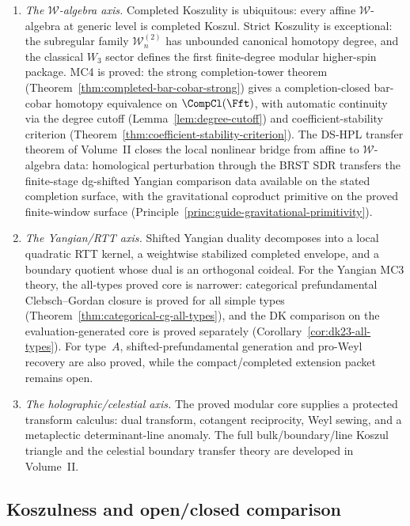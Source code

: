 \begin{enumerate}[label=\textup{(\alph*)}]
\item \emph{The $\mathcal W$-algebra axis.}
 Completed Koszulity is ubiquitous: every affine $\mathcal W$-algebra
 at generic level is completed Koszul. Strict Koszulity is
 exceptional: the subregular family $\mathcal W_n^{(2)}$ has
 unbounded canonical homotopy degree, and the classical $W_3$ sector
 defines the first finite-degree modular higher-spin package.
 MC4 is proved: the strong completion-tower theorem
 (Theorem~\ref{thm:completed-bar-cobar-strong}) gives a
 completion-closed bar-cobar homotopy equivalence on $\CompCl(\Fft)$,
 with automatic continuity via the degree cutoff
 (Lemma~\ref{lem:degree-cutoff}) and coefficient-stability criterion
 (Theorem~\ref{thm:coefficient-stability-criterion}).
 The DS-HPL transfer theorem of Volume~II closes the
 local nonlinear bridge from affine to $\mathcal{W}$-algebra
 data: homological perturbation through the BRST SDR transfers
 the finite-stage dg-shifted Yangian comparison data available on
 the stated completion surface, with the gravitational
 coproduct primitive on the proved finite-window surface
 (Principle~\ref{princ:guide-gravitational-primitivity}).
\item \emph{The Yangian/RTT axis.}
 Shifted Yangian duality decomposes into a local quadratic RTT
 kernel, a weightwise stabilized completed envelope, and a boundary
 quotient whose dual is an orthogonal coideal. For the Yangian MC3
 theory, the all-types proved core is narrower: categorical
 prefundamental Clebsch--Gordan closure is proved for all simple types
 \textup{(}Theorem~\ref{thm:categorical-cg-all-types}\textup{)}, and
 the DK comparison on the evaluation-generated core is proved
 separately \textup{(}Corollary~\ref{cor:dk23-all-types}\textup{)}.
 For type~$A$, shifted-prefundamental generation and
 pro-Weyl recovery are also proved, while the compact/completed extension packet
 remains open.
\item \emph{The holographic/celestial axis.}
 The proved modular core supplies a protected transform calculus:
 dual transform, cotangent reciprocity, Weyl sewing, and a
 metaplectic determinant-line anomaly. The
 full bulk/boundary/line Koszul triangle and the celestial boundary
 transfer theory are developed in Volume~II.
\end{enumerate}

\subsection{Koszulness and open/closed comparison}

